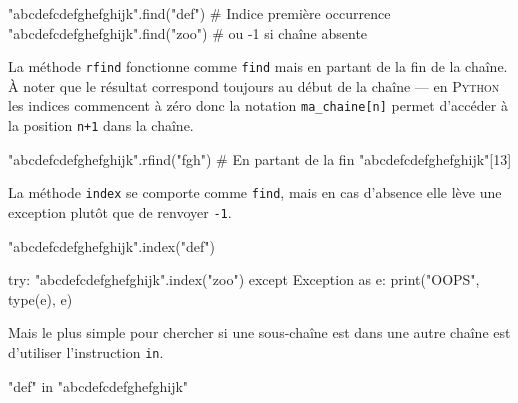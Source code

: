 \begin{idleconsole}
	\begin{pyconsole}
		"abcdefcdefghefghijk".find("def") # Indice première occurrence
		"abcdefcdefghefghijk".find("zoo") # ou -1 si chaîne absente
\end{pyconsole}
\end{idleconsole}

La méthode \texttt{rfind} fonctionne comme \texttt{find} mais en partant de la fin de la chaîne. À noter que le résultat correspond toujours au début de la chaîne --- en \textsc{Python} les indices commencent à zéro donc la notation \texttt{ma\_chaine[n]} permet d’accéder à la position \texttt{n+1} dans la chaîne.

\begin{idleconsole}
	\begin{pyconsole}
		"abcdefcdefghefghijk".rfind("fgh") # En partant de la fin
		"abcdefcdefghefghijk"[13]
\end{pyconsole}
\end{idleconsole}

La méthode \texttt{index} se comporte comme \texttt{find}, mais en cas d'absence elle lève une exception plutôt que de renvoyer \texttt{-1}.

\begin{idleconsole}[after skip=2pt]
\begin{pyconsole}
"abcdefcdefghefghijk".index("def")
\end{pyconsole}
\end{idleconsole}

\begin{idleconsole}
\begin{pyconsole}
try:
	"abcdefcdefghefghijk".index("zoo")
except Exception as e:
	print("OOPS", type(e), e)

\end{pyconsole}
\end{idleconsole}

Mais le plus simple pour chercher si une sous-chaîne est dans une autre chaîne est d'utiliser l'instruction \texttt{in}.

\begin{idleconsole}
\begin{pyconsole}
"def" in "abcdefcdefghefghijk"

\end{pyconsole}
\end{idleconsole}

